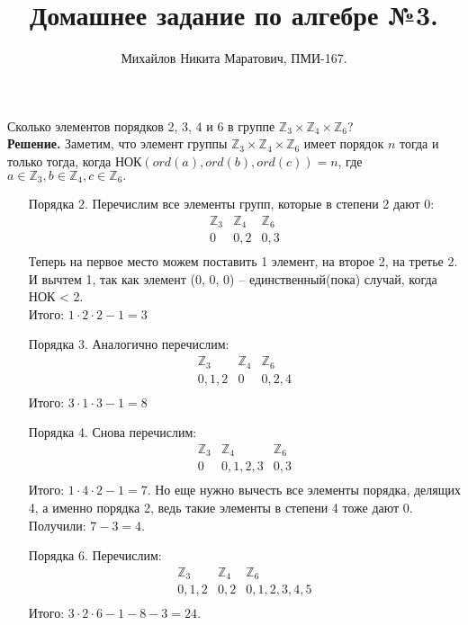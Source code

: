 \documentclass[a4paper, 12pt]{article}
\title{
     Домашнее задание по алгебре №3.
 }
\author{Михайлов Никита Маратович, ПМИ-167.
}
\date{}
\begin{document}
\maketitle
\begin{spacing}{1}


\begin{center}
\end{center}

\noindent Сколько элементов	порядков 2, 3, 4 и 6 в группе $\mathbb{Z}_3 \times \mathbb{Z}_4\times \mathbb{Z}_6$?\\

\noindent \textbf{Решение. } Заметим, что элемент группы $\mathbb{Z}_3 \times \mathbb{Z}_4\times \mathbb{Z}_6$ имеет порядок $n$ тогда и только тогда, когда $\text{НОК}(ord(a), ord(b), ord(c)) = n$, где $a\in\mathbb{Z}_3,b\in\mathbb{Z}_4,c\in\mathbb{Z}_6.$
\begin{enumerate}
	\item[Порядка 2.] Перечислим все элементы групп, которые в степени 2 дают 0:
	$$
	\begin{array}{c|c|c}
		\mathbb{Z}_3 & \mathbb{Z}_4 & \mathbb{Z}_6\\
		\hline 
		0 & 0, 2 & 0, 3\\
	\end{array}
	$$
	Теперь на первое место можем поставить 1 элемент, на второе 2, на третье 2. И вычтем 1, так как элемент (0, 0, 0) -- единственный(пока) случай, когда НОК < 2.\\
	Итого: $1\cdot2\cdot2 - 1 = 3$
	
	\item[Порядка 3.] Аналогично перечислим:
	$$
	\begin{array}{c|c|c}
	\mathbb{Z}_3 & \mathbb{Z}_4 & \mathbb{Z}_6\\
	\hline 
	0,1,2 & 0 & 0, 2, 4\\
	\end{array}
	$$
	Итого: $3\cdot 1\cdot3 - 1 = 8$
	\item[Порядка 4.] Снова перечислим:
	$$
	\begin{array}{c|c|c}
	\mathbb{Z}_3 & \mathbb{Z}_4 & \mathbb{Z}_6\\
	\hline 
	0 & 0,1,2,3 & 0, 3\\
	\end{array}
	$$
	Итого: $1\cdot4\cdot2 - 1 = 7$. Но еще нужно вычесть все элементы порядка, делящих 4, а именно порядка 2, ведь такие элементы в степени 4 тоже дают 0. Получили: $7 - 3 = 4$.
	
	\item[Порядка 6.] Перечислим:
	$$
	\begin{array}{c|c|c}
	\mathbb{Z}_3 & \mathbb{Z}_4 & \mathbb{Z}_6\\
	\hline 
	0,1,2 & 0,2 & 0,1,2,3,4,5\\
	\end{array}
	$$
	Итого: $3\cdot2\cdot6 - 1 - 8 -3 = 24$.
\end{enumerate}



\end{spacing}
\end{document}

